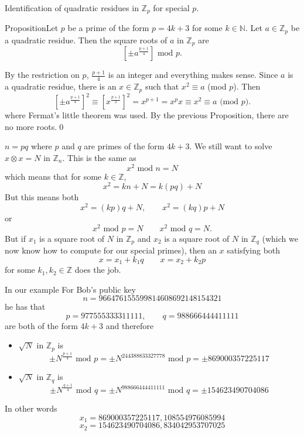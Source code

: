 \documentclass{beamer}
\def\bl[#1]#2{\begin{block}{#1}#2\end{block}}
\def\itemb{\begin{itemize}}
\def\iteme{\end{itemize}}
\begin{document}
\begin{frame}{Identification of quadratic residues in $\mathbb{Z}_p$ for special $p$.}
\bl[Proposition]{Let $p$ be a prime of the form $p=4k+3$ for some $k\in\mathbb{N}$. Let $a\in\mathbb{Z}_p$ be a quadratic residue. Then the square roots of $a$ in $\mathbb{Z}_p$ are
\[
\left[\pm a^{\frac{p+1}{4}}\right]\textrm{ mod }p.
\]}
By the restriction on $p$, $\frac{p+1}{4}$ is an integer and everything makes sense. Since $a$ is a quadratic residue, there is an $x\in\mathbb{Z}_p$ such that $x^2\equiv a$ (\textrm{mod} $p$). Then
\[
\left[\pm a^{\frac{p+1}{4}}\right]^2\equiv \left[x^{\frac{p+1}{2}}\right]^2=x^{p+1}=x^p x\equiv x^2\equiv a\textrm{ (mod $p$)}.
\]
where Fermat's little theorem was used. By the previous Proposition, there are no more roots.\qed
\end{frame}

\begin{frame}{$n=pq$ where $p$ and $q$ are primes of the form $4k+3$.}
We still want to solve $x\otimes x=N$ in $\mathbb{Z}_n$. This is the same as
\[
x^2\textrm{ mod $n$}=N
\]
which means that for some $k\in\mathbb{Z}$,
\[
x^2=kn+N=k(pq)+N
\]
But this means both
\[
x^2=(kp)q+N,\qquad x^2=(kq)p+N
\]
or
\[
x^2\textrm{ mod $p$}=N\qquad x^2\textrm{ mod $q$}=N.
\]
But if $x_1$ is a square root of $N$ in $\mathbb{Z}_{p}$ and $x_2$ is a square root of $N$ in $\mathbb{Z}_{q}$ (which we now know how to compute for our special primes), then an $x$ satisfying both
\[
x=x_1+k_1q\qquad x=x_2+k_2p
\]
for some $k_1,k_2\in\mathbb{Z}$ does the job.
\end{frame}

\begin{frame}{In our example}
For Bob's public key
\[
n=966476155599814608692148154321
\]
he has that
\[
p=977555333311111,\qquad q=988666444411111 
\]
are both of the form $4k+3$ and therefore
\itemb
\item $\sqrt{N}$ in $\mathbb{Z}_{p}$ is
\[
\pm N^{\frac{p+1}{4}}\textrm{ mod }p=\pm N^{244388833327778}\textrm{ mod }p=\pm 869000357225117
\]
\item $\sqrt{N}$ in $\mathbb{Z}_{q}$ is
\[
\pm N^{\frac{q+1}{4}}\textrm{ mod }q=\pm N^{988666444411111}\textrm{ mod }q=\pm 154623490704086
\]
\iteme
In other words
\[
x_1= 869000357225117, 108554976085994
\]
\[
x_2=154623490704086, 834042953707025
\]
\end{frame}
\end{document}
